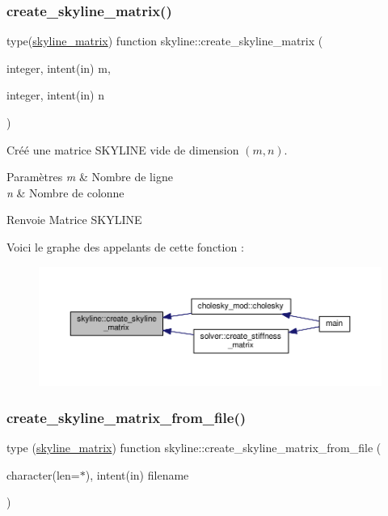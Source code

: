 \subsubsection{\texorpdfstring{create\+\_\+skyline\+\_\+matrix()}{create\_skyline\_matrix()}}
{\footnotesize\ttfamily type(\hyperlink{structskyline_1_1skyline__matrix}{skyline\+\_\+matrix}) function skyline\+::create\+\_\+skyline\+\_\+matrix (\begin{DoxyParamCaption}\item[{integer, intent(in)}]{m,  }\item[{integer, intent(in)}]{n }\end{DoxyParamCaption})}



Créé une matrice S\+K\+Y\+L\+I\+NE vide de dimension $(m,n)$. 


\begin{DoxyParams}{Paramètres}
{\em m} & Nombre de ligne \\
\hline
{\em n} & Nombre de colonne \\
\hline
\end{DoxyParams}
\begin{DoxyReturn}{Renvoie}
Matrice S\+K\+Y\+L\+I\+NE 
\end{DoxyReturn}
Voici le graphe des appelants de cette fonction \+:
\nopagebreak
\begin{figure}[H]
\begin{center}
\leavevmode
\includegraphics[width=350pt]{namespaceskyline_a5fe1d351df2e3a07f96028d1d2a892a8_icgraph}
\end{center}
\end{figure}
\mbox{\label{namespaceskyline_a86a4fe28bc106ef42d25cf7596c108bf}} 
\subsubsection{\texorpdfstring{create\+\_\+skyline\+\_\+matrix\+\_\+from\+\_\+file()}{create\_skyline\_matrix\_from\_file()}}
{\footnotesize\ttfamily type (\hyperlink{structskyline_1_1skyline__matrix}{skyline\+\_\+matrix}) function skyline\+::create\+\_\+skyline\+\_\+matrix\+\_\+from\+\_\+file (\begin{DoxyParamCaption}\item[{character(len=$\ast$), intent(in)}]{filename }\end{DoxyParamCaption})}



